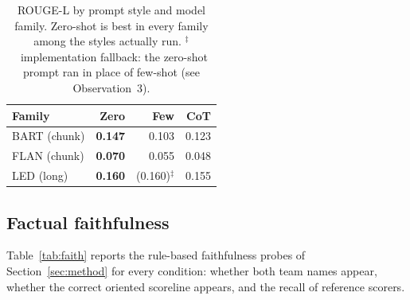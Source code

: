 \documentclass[10pt,a4paper]{article}
\begin{document}
\begin{table}[h]
\centering\small
\begin{tabular}{lrrr}
\toprule
\textbf{Family} & \textbf{Zero} & \textbf{Few} & \textbf{CoT} \\
\midrule
BART (chunk) & \textbf{0.147} & 0.103 & 0.123 \\
FLAN (chunk) & \textbf{0.070} & 0.055 & 0.048 \\
LED (long)   & \textbf{0.160} & (0.160)$^{\ddagger}$ & 0.155 \\
\bottomrule
\end{tabular}
\caption{ROUGE-L by prompt style and model family. Zero-shot is best in every family among the styles actually run. $^{\ddagger}$~implementation fallback: the zero-shot prompt ran in place of few-shot (see Observation~3).}
\label{tab:prompts}
\end{table}

\subsection{Factual faithfulness}
\label{sec:faith}

Table~\ref{tab:faith} reports the rule-based faithfulness probes of Section~\ref{sec:method} for every condition: whether both team names appear, whether the correct oriented scoreline appears, and the recall of reference scorers.
\end{document}
